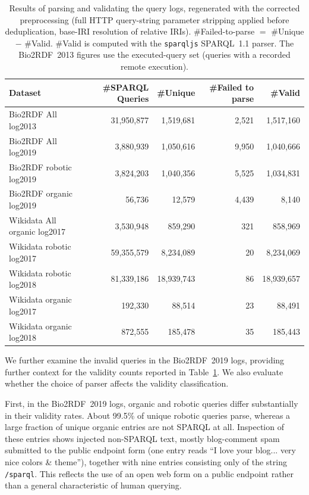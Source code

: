 \documentclass[sw]{iosart2x}
\begin{document}
\begin{table}[ht]
\centering
\caption{Results of parsing and validating the query logs, regenerated with the
corrected preprocessing (full HTTP query-string parameter stripping applied before
deduplication, base-IRI resolution of relative IRIs). \#Failed-to-parse $=$ \#Unique
$-$ \#Valid. \#Valid is computed with the \texttt{sparqljs} SPARQL~1.1 parser.
The Bio2RDF~2013 figures use the executed-query set (queries with a recorded remote
execution).}
\label{tab:2}
\begin{tabular}{l|r|r|r|r}
\hline
Dataset & \#SPARQL Queries & \#Unique & \#Failed to parse & \#Valid \\
\hline
Bio2RDF All log2013 & 31,950,877 & 1,519,681 & 2,521 & 1,517,160 \\
Bio2RDF All log2019 & 3,880,939 & 1,050,616 & 9,950 & 1,040,666 \\
Bio2RDF robotic log2019 & 3,824,203 & 1,040,356 & 5,525 & 1,034,831 \\
Bio2RDF organic log2019 & 56,736 & 12,579 & 4,439 & 8,140 \\
Wikidata All organic log2017 & 3,530,948 & 859,290 & 321 & 858,969 \\
Wikidata robotic log2017 & 59,355,579 & 8,234,089 & 20 & 8,234,069 \\
Wikidata robotic log2018 & 81,339,186 & 18,939,743 & 86 & 18,939,657 \\
Wikidata organic log2017 & 192,330 & 88,514 & 23 & 88,491 \\
Wikidata organic log2018 & 872,555 & 185,478 & 35 & 185,443 \\
\hline
\end{tabular}
\end{table}


We further examine the invalid queries in the Bio2RDF~2019 logs, providing further context for the validity counts reported in Table~\ref{tab:2}. We also evaluate whether the choice of parser affects the validity classification.

First, in the Bio2RDF~2019 logs, organic and robotic queries differ substantially in their validity rates. About 99.5\% of unique robotic queries parse, whereas a large fraction of unique organic entries are not SPARQL at all. Inspection of these entries shows injected non-SPARQL text, mostly blog-comment spam submitted to the public endpoint form (one entry reads ``I love your blog... very nice colors \& theme''), together with nine entries consisting only of the string \texttt{/sparql}. This reflects the use of an open web form on a public endpoint rather than a general characteristic of human querying. 
\end{document}
